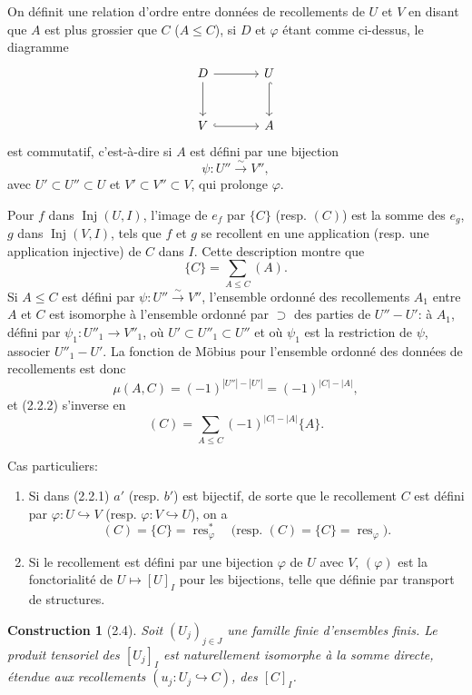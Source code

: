 \documentclass[11pt]{article}
\newcommand{\Inj}{\operatorname{Inj}}
\newcommand{\res}{\operatorname{res}}
\theoremstyle{deligne}
\newtheorem*{construction*}{Construction}
\newcommand{\para}[1]{\vspace{0.65em}\noindent{\bfseries #1}\quad}
\begin{document}
On définit une relation d'ordre entre données de recollements de \(U\) et \(V\) en disant que \(A\) est plus grossier que \(C\) (\(A\le C\)), si \(D\) et \(\varphi\) étant comme ci-dessus, le diagramme
\[
\begin{tikzcd}[column sep=large,row sep=large]
D \arrow[r] \arrow[d] & U \arrow[d,hook]\\
V \arrow[r,hook] & A
\end{tikzcd}
\]
est commutatif, c'est-à-dire si \(A\) est défini par une bijection
\[
  \psi:U''\overset{\sim}{\longrightarrow}V'',
\]
avec \(U'\subset U''\subset U\) et \(V'\subset V''\subset V\), qui prolonge \(\varphi\).

Pour \(f\) dans \(\Inj(U,I)\), l'image de \(e_f\) par \(\{C\}\) (resp. \((C)\)) est la somme des \(e_g\), \(g\) dans \(\Inj(V,I)\), tels que \(f\) et \(g\) se recollent en une application (resp. une application injective) de \(C\) dans \(I\). Cette description montre que
\[
  \{C\}=\sum_{A\le C}(A).
  \tag{2.2.2}
\]
Si \(A\le C\) est défini par \(\psi:U''\overset{\sim}{\to}V''\), l'ensemble ordonné des recollements \(A_1\) entre \(A\) et \(C\) est isomorphe à l'ensemble ordonné par \(\supset\) des parties de \(U''-U'\): à \(A_1\), défini par \(\psi_1:U''_1\to V''_1\), où \(U'\subset U''_1\subset U''\) et où \(\psi_1\) est la restriction de \(\psi\), associer \(U''_1-U'\). La fonction de Möbius pour l'ensemble ordonné des données de recollements est donc
\[
  \mu(A,C)=(-1)^{|U''|-|U'|}=(-1)^{|C|-|A|},
\]
et (2.2.2) s'inverse en
\[
  (C)=\sum_{A\le C}(-1)^{|C|-|A|}\{A\}.
  \tag{2.2.3}
\]

\para{2.3.}
Cas particuliers:
\begin{enumerate}[label=(\roman*)]
\item Si dans (2.2.1) \(a'\) (resp. \(b'\)) est bijectif, de sorte que le recollement \(C\) est défini par \(\varphi:U\hookrightarrow V\) (resp. \(\varphi:V\hookrightarrow U\)), on a
\[
  (C)=\{C\}=\res_\varphi^*
  \quad
  \text{(resp. }(C)=\{C\}=\res_\varphi\text{)}.
\]
\item Si le recollement est défini par une bijection \(\varphi\) de \(U\) avec \(V\), \((\varphi)\) est la fonctorialité de \(U\mapsto[U]_I\) pour les bijections, telle que définie par transport de structures.
\end{enumerate}

\begin{construction*}[2.4]
Soit \((U_j)_{j\in J}\) une famille finie d'ensembles finis. Le produit tensoriel des \([U_j]_I\) est naturellement isomorphe à la somme directe, étendue aux recollements \((u_j:U_j\hookrightarrow C)\), des \([C]_I\).
\end{construction*}
\end{document}
